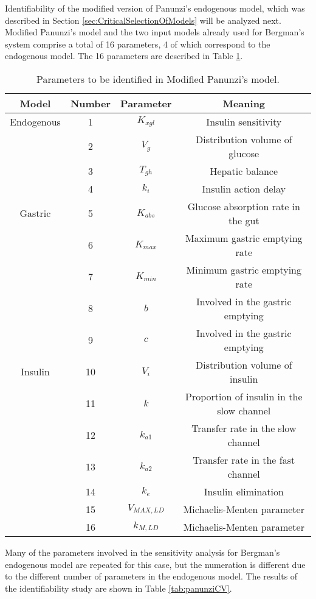 Identifiability of the modified version of Panunzi's endogenous model, which was described in Section \ref{sec:CriticalSelectionOfModels} will be analyzed next. Modified Panunzi's model and the two input models already used for Bergman's system comprise a total of 16 parameters, 4 of which correspond to the endogenous model. The 16 parameters are described in Table \ref{tab:panunziparameters}.

\begin{table}[hbt]
  \begin{center}
	\begin{tabular}{| c | c | c | c |}
	\hline 
	Model	& Number & Parameter & Meaning \\
	\hline 
	Endogenous & 1 & $K_{xgl}$ & Insulin sensitivity \\
	 & 2 & $V_{g}$ & Distribution volume of glucose\\
	 & 3 & $T_{gh}$ & Hepatic balance \\
	 & 4 & $k_{i}$ & Insulin action delay \\
	\hline
	Gastric & 5 & $K_{abs}$ & Glucose absorption rate in the gut \\
	 & 6 & $K_{max}$ & Maximum gastric emptying rate \\
	 & 7 & $K_{min}$ & Minimum gastric emptying rate \\	
	 & 8 & $b$ & Involved in the gastric emptying \\
	 & 9 & $c$ & Involved in the gastric emptying \\
	\hline
	Insulin & 10 & $V_{i}$ & Distribution volume of insulin \\
	 & 11 & $k$ & Proportion of insulin in the slow channel \\
	 & 12 & $k_{a1}$ & Transfer rate in the slow channel \\
	 & 13 & $k_{a2}$ & Transfer rate in the fast channel \\
	 & 14 & $k_{e}$ & Insulin elimination \\
	 & 15 & $V_{MAX,LD}$ & Michaelis-Menten parameter \\
	 & 16 & $k_{M,LD}$ & Michaelis-Menten parameter \\
	\hline	
	\end{tabular}
  \end{center}
  \caption{Parameters to be identified in Modified Panunzi's model.}
	\label{tab:panunziparameters}
\end{table}

Many of the parameters involved in the sensitivity analysis for Bergman's endogenous model are repeated for this case, but the numeration is different due to the different number of parameters in the endogenous model. The results of the identifiability study are shown in Table \ref{tab:panunziCV}.

